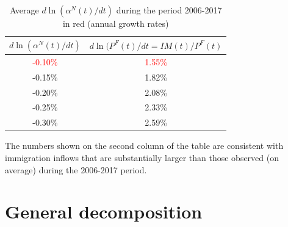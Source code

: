 \documentclass[
    abstract=true,
    11pt,
    letterpaper,
    oneside,
    headinclude,
    footinclude,
    BCOR=5mm,
]{scrartcl}
\begin{document}
\begin{table}[H]
\centering
\begin{tabular}{c|c}
  \hline
  $d\ln(\alpha^N(t)/dt)$ & $d \ln(P^F(t)/dt = IM(t)/P^F(t)$ \\ \hline
  \textcolor{red}{-0.10\%} & \textcolor{red}{1.55\%} \\
  -0.15\% & 1.82\% \\
  -0.20\% & 2.08\% \\
  -0.25\% & 2.33\% \\
  -0.30\% & 2.59\% \\
  \hline
\end{tabular}
\caption{Average $d\ln(\alpha^N(t)/dt)$ during the period 2006-2017 in red (annual growth rates)}
\end{table}
The numbers shown on the second column of the table are consistent with immigration inflows that are substantially larger than those observed (on average) during the 2006-2017 period.

\newpage

\section{General decomposition}
\end{document}
